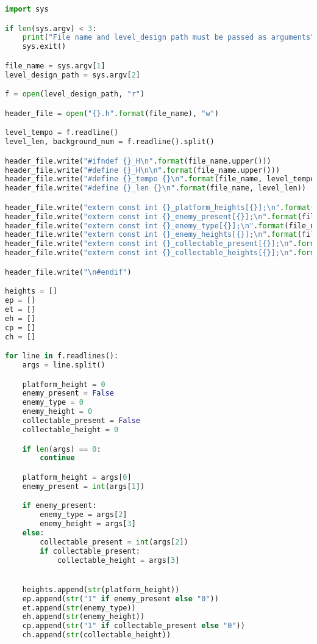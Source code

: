 \begin{lstlisting}[language=python,label={lst:levelparser},caption={\textit{script python} para realizar o \textit{parse}}]
import sys

if len(sys.argv) < 3:
    print("File name and level_design path must be passed as arguments")
    sys.exit()

file_name = sys.argv[1]
level_design_path = sys.argv[2]

f = open(level_design_path, "r")

header_file = open("{}.h".format(file_name), "w")

level_tempo = f.readline()
level_len, background_num = f.readline().split()

header_file.write("#ifndef {}_H\n".format(file_name.upper()))
header_file.write("#define {}_H\n\n".format(file_name.upper()))
header_file.write("#define {}_tempo {}\n".format(file_name, level_tempo))
header_file.write("#define {}_len {}\n".format(file_name, level_len))

header_file.write("extern const int {}_platform_heights[{}];\n".format(file_name, str(level_len)))
header_file.write("extern const int {}_enemy_present[{}];\n".format(file_name, str(level_len)))
header_file.write("extern const int {}_enemy_type[{}];\n".format(file_name, str(level_len)))
header_file.write("extern const int {}_enemy_heights[{}];\n".format(file_name, str(level_len)))
header_file.write("extern const int {}_collectable_present[{}];\n".format(file_name, str(level_len)))
header_file.write("extern const int {}_collectable_heights[{}];\n".format(file_name, str(level_len)))

header_file.write("\n#endif")

heights = []
ep = []
et = []
eh = []
cp = []
ch = []

for line in f.readlines():
    args = line.split()

    platform_height = 0
    enemy_present = False
    enemy_type = 0
    enemy_height = 0
    collectable_present = False
    collectable_height = 0

    if len(args) == 0:
        continue

    platform_height = args[0]
    enemy_present = int(args[1])

    if enemy_present:
        enemy_type = args[2]
        enemy_height = args[3]
    else:
        collectable_present = int(args[2])
        if collectable_present:
            collectable_height = args[3]


    heights.append(str(platform_height))
    ep.append(str("1" if enemy_present else "0"))
    et.append(str(enemy_type))
    eh.append(str(enemy_height))
    cp.append(str("1" if collectable_present else "0"))
    ch.append(str(collectable_height))


\end{lstlisting}
